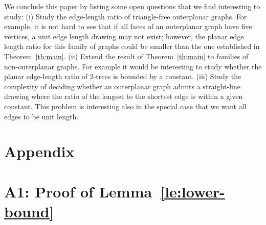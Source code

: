 \documentclass[orivec]{llncs}
\begin{document}
We conclude this paper by listing some open questions that we find interesting to study: (i) Study the edge-length ratio of triangle-free outerplanar graphs. For example, it is not hard to see that if all faces of an outerplanar graph have five vertices, a unit edge length drawing may not exist; however, the planar edge length ratio for this family of graphs could be smaller than the one established in Theorem~\ref{th:main}.
(ii) Extend the result of Theorem~\ref{th:main} to families of non-outerplanar graphs. For example it would be interesting to study whether the planar edge-length ratio of 2-trees is bounded by a constant.
(iii) Study the complexity of deciding whether an outerplanar graph admits a straight-line drawing where the ratio of the longest to the shortest edge is within a given constant. This problem is interesting also in the special case that we want all edges to be unit length.


\newpage



\newpage
\section*{Appendix}

\section*{A1: Proof of Lemma~\ref{le:lower-bound}}
\end{document}
